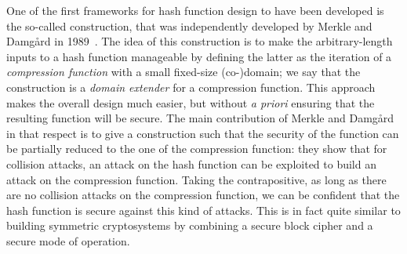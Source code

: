 One of the first frameworks for hash function design to have been developed is the so-called \merkdam construction, that was independently developed by
Merkle and Damg\aa rd in 1989~\cite{DBLP:conf/crypto/Merkle89a,DBLP:conf/crypto/Damgard89a}. The idea of this construction is to make the arbitrary-length
inputs to a hash function manageable by defining the latter as the iteration of a \emph{compression function} with a small fixed-size (co-)domain; we say
that the construction is a \emph{domain extender} for a compression function.
This approach makes the overall design much easier, but without \emph{a priori} ensuring that the resulting function will be secure. The main contribution of
Merkle and Damg\aa rd in that respect is to give a construction such that the security of the function can be partially reduced to the one of
the compression function: they show that for collision attacks, an attack on the hash function can be exploited to build an attack on the compression function.
Taking the contrapositive, as long as there are no collision attacks on the compression function, we can be confident that the hash function is secure against this kind of attacks.
This is in fact quite similar to building symmetric cryptosystems by combining a secure block cipher and a secure mode of operation.

